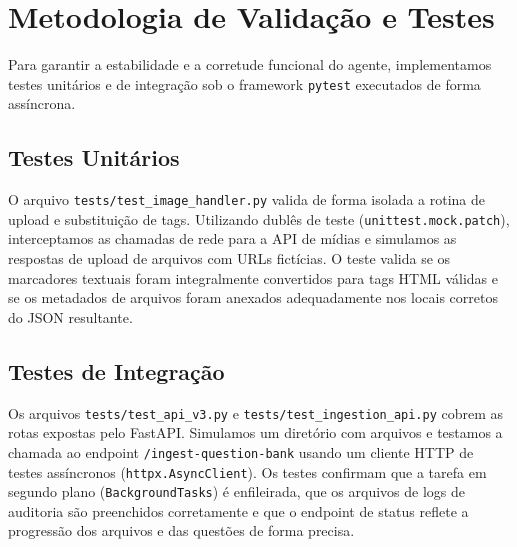 \documentclass[sigconf]{acmart}
\begin{document}
\section{Metodologia de Validação e Testes}
Para garantir a estabilidade e a corretude funcional do agente, implementamos testes unitários e de integração sob o framework \lstinline{pytest} executados de forma assíncrona.

\subsection{Testes Unitários}
O arquivo \lstinline{tests/test_image_handler.py} valida de forma isolada a rotina de upload e substituição de tags. Utilizando dublês de teste (\lstinline{unittest.mock.patch}), interceptamos as chamadas de rede para a API de mídias e simulamos as respostas de upload de arquivos com URLs fictícias. O teste valida se os marcadores textuais foram integralmente convertidos para tags HTML válidas e se os metadados de arquivos foram anexados adequadamente nos locais corretos do JSON resultante.

\subsection{Testes de Integração}
Os arquivos \lstinline{tests/test_api_v3.py} e \lstinline{tests/test_ingestion_api.py} cobrem as rotas expostas pelo FastAPI. Simulamos um diretório com arquivos e testamos a chamada ao endpoint \lstinline{/ingest-question-bank} usando um cliente HTTP de testes assíncronos (\lstinline{httpx.AsyncClient}). Os testes confirmam que a tarefa em segundo plano (\lstinline{BackgroundTasks}) é enfileirada, que os arquivos de logs de auditoria são preenchidos corretamente e que o endpoint de status reflete a progressão dos arquivos e das questões de forma precisa.
\end{document}
